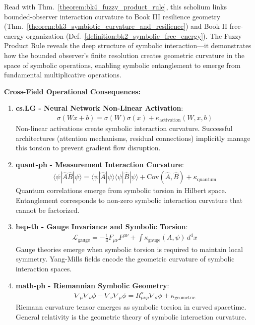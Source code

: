 \begin{scholium}
\label{scholium:bk4_symbolic_entanglement}
Read with Thm.~\ref{theorem:bk4_fuzzy_product_rule}, this scholium links bounded-observer interaction curvature to Book III resilience geometry (Thm.~\ref{theorem:bk3_symbiotic_curvature_and_resilience}) and Book II free-energy organization (Def.~\ref{definition:bk2_symbolic_free_energy}).
The Fuzzy Product Rule reveals the deep structure of symbolic interaction---it demonstrates how the bounded observer's finite resolution creates geometric curvature in the space of symbolic operations, enabling symbolic entanglement to emerge from fundamental multiplicative operations.

\textbf{Cross-Field Operational Consequences:}

\begin{enumerate}
\item \textbf{cs.LG - Neural Network Non-Linear Activation}: 
   \begin{align}
   \sigma(Wx + b) = \sigma(W)\sigma(x) + \kappa_{\text{activation}}(W, x, b)
   \end{align}
   Non-linear activations create symbolic interaction curvature. Successful architectures (attention mechanisms, residual connections) implicitly manage this torsion to prevent gradient flow disruption.

\item \textbf{quant-ph - Measurement Interaction Curvature}:
   \begin{align}
   \langle \psi | \hat{A}\hat{B} | \psi \rangle = \langle \psi | \hat{A} | \psi \rangle \langle \psi | \hat{B} | \psi \rangle + \text{Cov}(\hat{A}, \hat{B}) + \kappa_{\text{quantum}}
   \end{align}
   Quantum correlations emerge from symbolic torsion in Hilbert space. Entanglement corresponds to non-zero symbolic interaction curvature that cannot be factorized.

\item \textbf{hep-th - Gauge Invariance and Symbolic Torsion}:
   \begin{align}
   \mathcal{L}_{\text{gauge}} = -\frac{1}{4}F_{\mu\nu}F^{\mu\nu} + \int \kappa_{\text{gauge}}(A, \psi) \, d^4x
   \end{align}
   Gauge theories emerge when symbolic torsion is required to maintain local symmetry. Yang-Mills fields encode the geometric curvature of symbolic interaction spaces.

\item \textbf{math-ph - Riemannian Symbolic Geometry}:
   \begin{align}
   \nabla_\mu \nabla_\nu \phi - \nabla_\nu \nabla_\mu \phi = R_{\mu\nu\rho}^\sigma \nabla_\sigma \phi + \kappa_{\text{geometric}}
   \end{align}
   Riemann curvature tensor emerges as symbolic torsion in curved spacetime. General relativity is the geometric theory of symbolic interaction curvature.


\end{enumerate}
\end{scholium}
